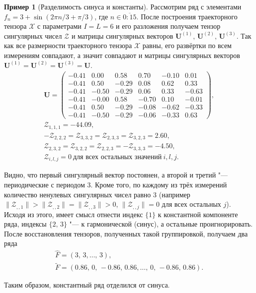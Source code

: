 \documentclass[specialist,
    substylefile = spbu_report.rtx,
    subf,href,colorlinks=true, 12pt]{disser}
\theoremstyle{plain}
\theoremstyle{definition}
\newtheorem{example}{Пример}[section]
\theoremstyle{remark}
\begin{document}
    \begin{example}[Разделимость синуса и константы]
        Рассмотрим ряд с элементами $f_n=3+\sin(2\pi n / 3 + \pi/3)$, где $n\in \overline{0:15}$.
        После построения траекторного тензора $\mathcal{X}$ с параметрами $I=L=6$ и его разложения получаем тензор
        сингулярных чисел $\mathcal{Z}$ и матрицы сингулярных векторов $\mathbf{U}^{(1)},\, \mathbf{U}^{(2)},\,\mathbf{U}^{(3)}$.
        Так как все размерности траекторного тензора $\mathcal{X}$ равны, его развёртки по всем
        измерениям совпадают, а значит совпадают и матрицы сингулярных векторов $\mathbf{U}^{(1)}=\mathbf{U}^{(2)}=\mathbf{U}^{(3)}=\mathbf{U}$.
        \begin{gather*}
            \mathbf{U}=
            \begin{pmatrix}
                -0.41 & 0.00  & 0.58  & 0.70  & -0.10 & 0.01  \\
                -0.41 & 0.50  & -0.29 & 0.08  & 0.62  & 0.33  \\
                -0.41 & -0.50 & -0.29 & 0.06  & 0.33  & -0.63 \\
                -0.41 & -0.00 & 0.58  & -0.70 & 0.10  & -0.01 \\
                -0.41 & 0.50  & -0.29 & -0.08 & -0.62 & -0.33 \\
                -0.41 & -0.50 & -0.29 & -0.06 & -0.33 & 0.63
            \end{pmatrix},\\
            \mathcal{Z}_{1,1,1}=-44.09,\\
            -\mathcal{Z}_{2,2,2}=\mathcal{Z}_{3,3,2}=\mathcal{Z}_{2,3,3}=\mathcal{Z}_{3,2,3}=2.60,\\
            \mathcal{Z}_{2,3,2}=\mathcal{Z}_{3,2,2}=\mathcal{Z}_{2,2,3}=-\mathcal{Z}_{3,3,3}=-4.50,\\
            \mathcal{Z}_{i,l,j}=0~\text{для всех остальных значений}~i, l, j.
        \end{gather*}

        Видно, что первый сингулярный вектор постоянен, а второй и третий "--- периодические с периодом 3.
        Кроме того, по каждому из трёх измерений количество ненулевых сингулярных чисел равно 3
        (например $\|\mathcal{Z}_{,,1}\|>\|\mathcal{Z}_{,,2}\|=\|\mathcal{Z}_{,,3}\|>0$, $\|\mathcal{Z}_{,,j}\|=0$ для всех остальных $j$).
        Исходя из этого, имеет смысл отнести индекс $\{1\}$ к константной компоненте ряда, индексы $\{2,\, 3\}$ "---
        к гармонической (синус), а остальные проигнорировать.
        После восстановления тензоров, полученных такой группировкой, получаем два ряда
        \begin{gather*}
            \hat{F}=(3,\, 3,\ldots,\, 3),\\
            \tilde{F}=(0.86,\, 0,\, -0.86,\,  0.86,\ldots,\, 0,\, -0.86,\, 0.86).
        \end{gather*}

        Таким образом, константный ряд отделился от синуса.
    \end{example}
\end{document}
